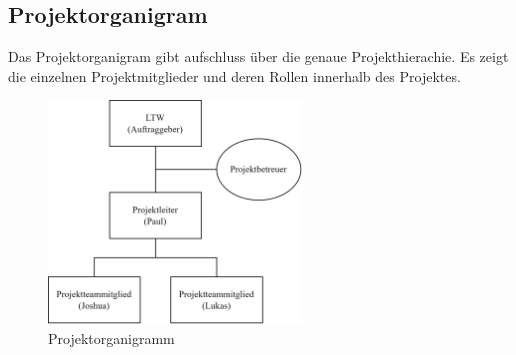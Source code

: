 \subsection{Projektorganigram}

Das Projektorganigram gibt aufschluss über die genaue Projekthierachie. Es zeigt die einzelnen Projektmitglieder und deren Rollen innerhalb des Projektes\cite{projektorganigramm}.

\begin{figure}[ht]
  \centering
  \includegraphics[width=0.6\textwidth]{images/projektorganigramm.png}
  \caption{Projektorganigramm}
  \label{fig:projektorganigramm}
\end{figure}